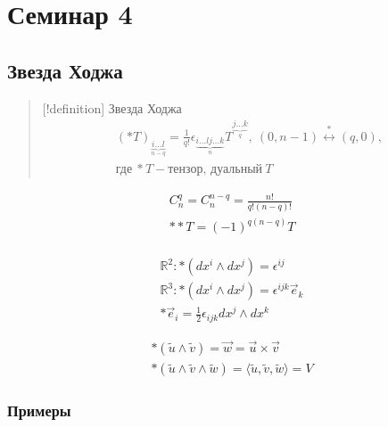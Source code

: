 \section{Семинар 4}

\subsection{Звезда
Ходжа}

\begin{quote}
{[}!definition{]} Звезда Ходжа $$\begin{gather}
(*T)_{\underbrace{i\dots l}_{n-q}} = \frac{1}{q!}\epsilon_{\underbrace{i\dots lj\dots k}_{n}}T^{\underbrace{j\dots k}_{q}}, \ (0,n-1) \overset{*}{\leftrightarrow} (q,0), \\
\text{где} \ *T - \text{тензор, дуальный} \ T
\end{gather}$$
\end{quote}

$$\begin{gather}
C_{n}^{q} = C_{n}^{n-q} = \frac{n!}{q!(n-q)!} \\
**T = (-1)^{q(n-q)}T \\
\end{gather}$$

$$\begin{gather}
\mathbb{R}^{2}: *(dx^{i}\wedge dx^{j}) = \epsilon^{ij} \\
\mathbb{R}^{3}: *(dx^{i}\wedge dx^{j}) = \epsilon^{ijk}\vec{e}_{k} \\
*\vec{e}_{i} = \frac{1}{2}\epsilon_{ijk}dx^{j}\wedge dx^{k}
\end{gather}$$

$$\begin{gather}
*(\tilde{u}\wedge\tilde{v}) = \vec{w} = \vec{u} \times \vec{v} \\
*(\tilde{u}\wedge\tilde{v}\wedge\tilde{w}) = \langle \tilde{u},\tilde{v},\tilde{w} \rangle = V
\end{gather}$$

\subsubsection{Примеры}


